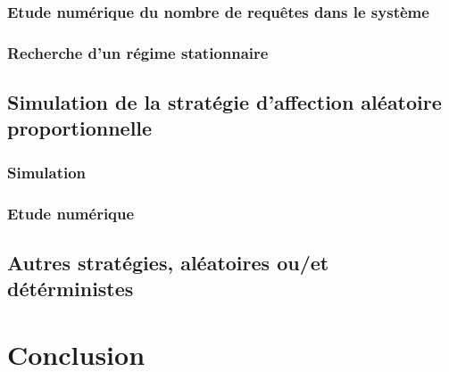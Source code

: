 \documentclass{article}
\begin{document}
\subsubsection{Etude numérique du nombre de requêtes dans le système}
\subsubsection{Recherche d'un régime stationnaire}

\subsection{Simulation de la stratégie d'affection aléatoire proportionnelle}
\subsubsection{Simulation}
\subsubsection{Etude numérique}

\subsection{Autres stratégies, aléatoires ou/et détérministes}

\section{Conclusion}
\paragraph{}

\newpage
\appendix

\section{}

\subsection{}
\begin{verbatim}
\end{verbatim}
\end{document}
